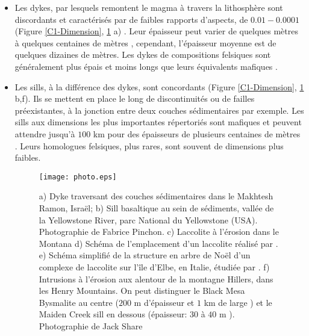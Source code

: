 \begin{itemize}
\item Les dykes, par lesquels remontent le magma à travers la
 lithosphère sont discordants et caractérisés par de faibles rapports
 d'aspects, de $0.01-0.0001$ (Figure \ref{C1-Dimension},
 \ref{C1-picture} a)
 \citep{Rubin:1995upa,Schultz:2008ih,Kavanagh:2011kf}. Leur
 épaisseur peut varier de quelques mètres à quelques centaines de
 mètres \citep{Walker:1989jq,Krumbholz:2014dj}, cependant,
 l'épaisseur moyenne est de quelques dizaines de mètres. Les dykes de
 compositions felsiques sont généralement plus épais et moins longs
 que leurs équivalents mafiques \citep{Rubin:1995upa}.

\item Les sills, à la différence des dykes, sont concordants (Figure
 \ref{C1-Dimension}, \ref{C1-picture} b,f). Ils se mettent en place
 le long de discontinuités ou de failles préexistantes, à la jonction
 entre deux couches sédimentaires par exemple. Les sills aux
 dimensions les plus importantes répertoriés sont mafiques et peuvent
 attendre jusqu'à $100$ km pour des épaisseurs de plusieurs centaines
 de mètres \citep{Cruden:tg}. Leurs homologues felsiques, plus
 rares, sont souvent de dimensions plus faibles.

 \begin{figure}[htpb]
 \begin{center}
 \graphicspath{ {/Users/thorey/Documents/These/Manuscript/Figure/Chapter1/} }
 \texttt{[image: photo.eps]}
 \caption{a) Dyke traversant des couches sédimentaires dans le
 Makhtesh Ramon, Israël; b) Sill basaltique au sein de
 sédiments, vallée de la Yellowstone River, parc National du
 Yellowstone (USA). Photographie de Fabrice Pinchon. c)
 Laccolite à l'érosion dans le Montana d) Schéma de
 l'emplacement d'un laccolite réalisé par
 \citet{Gilbert:1877uk}. e) Schéma simplifié de la structure en
 arbre de Noël d'un complexe de laccolite sur l'île d'Elbe, en
 Italie, étudiée par \citet{Rocchi:2010dn}. f) Intrusions à
 l'érosion aux alentour de la montagne Hillers, dans les Henry
 Mountains. On peut distinguer le Black Mesa Bysmalite au
 centre ($200$ m d'épaisseur et $1$ km de large
 \citep{Morgan:2008hj}) et le Maiden Creek sill en dessous
 (épaisseur: $30$ à $40$ m \citep{Horsman:2005ct}).
 Photographie de Jack Share}
 \label{C1-picture}
 \end{center}
 \end{figure}


\end{itemize}
